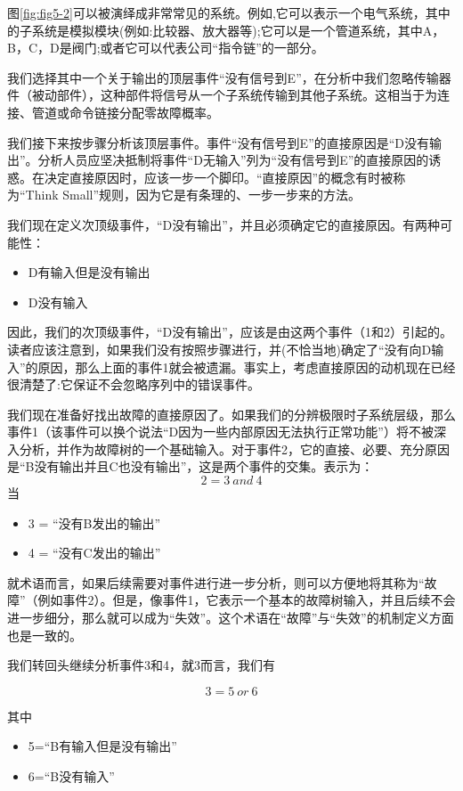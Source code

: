\documentclass[cn,11pt,chinese]{elegantbook}
\begin{document}
图\ref{fig:fig5-2}可以被演绎成非常常见的系统。例如,它可以表示一个电气系统，其中的子系统是模拟模块(例如:比较器、放大器等);它可以是一个管道系统，其中A，B，C，D是阀门;或者它可以代表公司“指令链”的一部分。

我们选择其中一个关于输出的顶层事件“没有信号到E”，在分析中我们忽略传输器件（被动部件），这种部件将信号从一个子系统传输到其他子系统。这相当于为连接、管道或命令链接分配零故障概率。

我们接下来按步骤分析该顶层事件。事件“没有信号到E”的直接原因是“D没有输出”。分析人员应坚决抵制将事件“D无输入”列为“没有信号到E”的直接原因的诱惑。在决定直接原因时，应该一步一个脚印。“直接原因”的概念有时被称为“Think Small”规则，因为它是有条理的、一步一步来的方法。

我们现在定义次顶级事件，“D没有输出”，并且必须确定它的直接原因。有两种可能性：

\begin{itemize}
\item D有输入但是没有输出
\item D没有输入
\end{itemize}

因此，我们的次顶级事件，“D没有输出”，应该是由这两个事件（1和2）引起的。读者应该注意到，如果我们没有按照步骤进行，并(不恰当地)确定了“没有向D输入”的原因，那么上面的事件1就会被遗漏。事实上，考虑直接原因的动机现在已经很清楚了:它保证不会忽略序列中的错误事件。

我们现在准备好找出故障的直接原因了。如果我们的分辨极限时子系统层级，那么事件1（该事件可以换个说法“D因为一些内部原因无法执行正常功能”）将不被深入分析，并作为故障树的一个基础输入。对于事件2，它的直接、必要、充分原因是“B没有输出并且C也没有输出”，这是两个事件的交集。表示为：
$$ 2=3 \ and \  4 $$
当

\begin{itemize}
\item  3 = “没有B发出的输出”
\item  4 = “没有C发出的输出”
\end{itemize}

就术语而言，如果后续需要对事件进行进一步分析，则可以方便地将其称为“故障”（例如事件2）。但是，像事件1，它表示一个基本的故障树输入，并且后续不会进一步细分，那么就可以成为“失效”。这个术语在“故障”与“失效”的机制定义方面也是一致的。

我们转回头继续分析事件3和4，就3而言，我们有

$$ 3 =5 \ or \ 6 $$

其中

\begin{itemize}
	\item  5=“B有输入但是没有输出”
	\item  6=“B没有输入”
\end{itemize}
\end{document}
